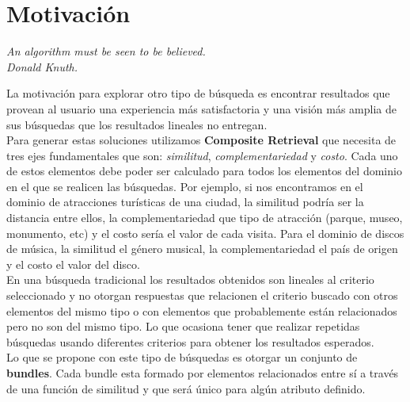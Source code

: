 \section{Motivación}
{\begin{small}%
\begin{flushright}%
\it An algorithm must be seen to be believed.\\Donald Knuth.
\end{flushright}%
\end{small}%
\vspace{.5cm}}
La motivación para explorar otro tipo de búsqueda es encontrar resultados que provean al 
usuario una experiencia más satisfactoria y una visión más amplia de sus búsquedas que los 
resultados lineales no entregan.\\
Para generar estas soluciones utilizamos \textbf{Composite Retrieval} que necesita de tres 
ejes fundamentales que son: \textit{similitud}, \textit{complementariedad} y \textit{costo}. 
Cada uno de estos elementos debe poder ser calculado para todos los elementos del dominio en el que 
se realicen las búsquedas. Por ejemplo, si nos encontramos en el dominio de atracciones turísticas 
de una ciudad, la similitud podría ser la distancia entre ellos, la complementariedad que tipo de 
atracción (parque, museo, monumento, etc) y el costo sería el valor de cada visita. Para el dominio 
de discos de música, la similitud el género musical, la complementariedad el país de origen y el 
costo el valor del disco.\\
En una búsqueda tradicional los resultados obtenidos son lineales al criterio seleccionado y no 
otorgan respuestas que relacionen el criterio buscado con otros elementos del mismo tipo o 
con elementos que probablemente están relacionados pero no son del mismo tipo. Lo que ocasiona 
tener que realizar repetidas búsquedas usando diferentes criterios para obtener los resultados 
esperados.\\
Lo que se propone con este tipo de búsquedas es otorgar un conjunto de \textbf{bundles}. Cada 
bundle esta formado por elementos relacionados entre sí a través de una función de similitud y que 
será único para algún atributo definido.
